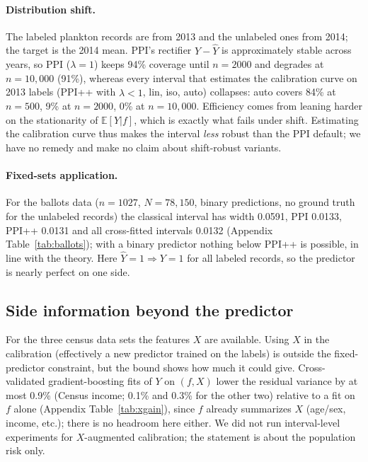 \paragraph{Distribution shift.} The labeled plankton records are from 2013 and the unlabeled ones from 2014; the target is the 2014 mean. PPI's rectifier $Y-\hat Y$ is approximately stable across years, so PPI ($\lambda{=}1$) keeps 94\% coverage until $n=2000$ and degrades at $n=10{,}000$ (91\%), whereas every interval that estimates the calibration curve on 2013 labels (PPI++ with $\hat\lambda<1$, lin, iso, auto) collapses: auto covers 84\% at $n=500$, 9\% at $n=2000$, 0\% at $n=10{,}000$. Efficiency comes from leaning harder on the stationarity of $\mathbb E[Y|f]$, which is exactly what fails under shift. Estimating the calibration curve thus makes the interval \emph{less} robust than the PPI default; we have no remedy and make no claim about shift-robust variants.
\paragraph{Fixed-sets application.} For the ballots data ($n=1027$, $N=78{,}150$, binary predictions, no ground truth for the unlabeled records) the classical interval has width 0.0591, PPI 0.0133, PPI++ 0.0131 and all cross-fitted intervals 0.0132 (Appendix Table~\ref{tab:ballots}); with a binary predictor nothing below PPI++ is possible, in line with the theory. Here $\hat Y=1\Rightarrow Y=1$ for all labeled records, so the predictor is nearly perfect on one side.

\begin{table}[t]\centering\small
\caption{Coverage (\%) on plankton (1000 replicates, 95\% nominal). Top: labeled and unlabeled data from the same year (2013); bottom: labeled 2013, unlabeled 2014, target is the 2014 mean. $N=20{,}000$.}\label{tab:shift}
\resizebox{\linewidth}{!}{}
\end{table}

\subsection{Side information beyond the predictor}\label{sec:exp-x}
For the three census data sets the features $X$ are available. Using $X$ in the calibration (effectively a new predictor trained on the labels) is outside the fixed-predictor constraint, but the bound shows how much it could give. Cross-validated gradient-boosting fits of $Y$ on $(f,X)$ lower the residual variance by at most 0.9\% (Census income; 0.1\% and 0.3\% for the other two) relative to a fit on $f$ alone (Appendix Table~\ref{tab:xgain}), since $f$ already summarizes $X$ (age/sex, income, etc.); there is no headroom here either. We did not run interval-level experiments for $X$-augmented calibration; the statement is about the population risk only.

